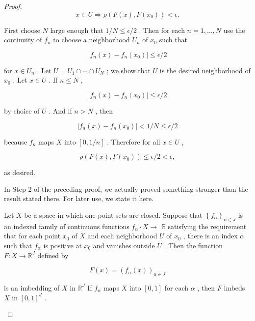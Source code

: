 \begin{proof}
\[
x \in  U \Rightarrow  \rho \left( {F\left( x\right) ,F\left( {x}_{0}\right) }\right)  < \epsilon .
\]

First choose \(N\) large enough that \(1/N \leq  \epsilon /2\) . Then for each \(n = 1,\ldots ,N\) use the continuity of \({f}_{n}\) to choose a neighborhood \({U}_{n}\) of \({x}_{0}\) such that

\[
\left| {{f}_{n}\left( x\right)  - {f}_{n}\left( {x}_{0}\right) }\right|  \leq  \epsilon /2
\]

for \(x \in  {U}_{n}\) . Let \(U = {U}_{1} \cap  \cdots  \cap  {U}_{N}\) ; we show that \(U\) is the desired neighborhood of \({x}_{0}\) . Let \(x \in  U\) . If \(n \leq  N\) ,

\[
\left| {{f}_{n}\left( x\right)  - {f}_{n}\left( {x}_{0}\right) }\right|  \leq  \epsilon /2
\]

by choice of \(U\) . And if \(n > N\) , then

\[
\left| {{f}_{n}\left( x\right)  - {f}_{n}\left( {x}_{0}\right) }\right|  < 1/N \leq  \epsilon /2
\]

because \({f}_{n}\) maps \(X\) into \(\left\lbrack  {0,1/n}\right\rbrack\) . Therefore for all \(x \in  U\) ,

\[
\rho \left( {F\left( x\right) ,F\left( {x}_{0}\right) }\right)  \leq  \epsilon /2 < \epsilon ,
\]

as desired.

In Step 2 of the preceding proof, we actually proved something stronger than the result stated there. For later use, we state it here.

\begin{theorem}
	Let \(X\) be a space in which one-point sets are closed. Suppose that \({\left\{  {f}_{\alpha }\right\}  }_{\alpha  \in  J}\) is an indexed family of continuous functions \({f}_{\alpha } \cdot  X \rightarrow\)  \(\mathbb{R}\) satisfying the requirement that for each point \({x}_{0}\) of \(X\) and each neighborhood \(U\) of \({x}_{0}\) , there is an index \(\alpha\) such that \({f}_{\alpha }\) is positive at \({x}_{0}\) and vanishes outside \(U\) . Then the function \(F : X \rightarrow  {\mathbb{R}}^{J}\) defined by

\[
F\left( x\right)  = {\left( {f}_{\alpha }\left( x\right) \right) }_{\alpha  \in  J}
\]

is an imbedding of \(X\) in \({\mathbb{R}}^{J}\) If \({f}_{\alpha }\) maps \(X\) into \(\left\lbrack  {0,1}\right\rbrack\) for each \(\alpha\) , then \(F\) imbeds \(X\) in \({\left\lbrack  0,1\right\rbrack  }^{J}\) .


\end{theorem}
\end{proof}

